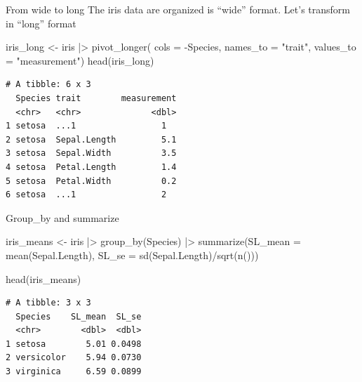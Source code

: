 \documentclass[
  ignorenonframetext,
  aspectratio=169,
]{beamer}
\newenvironment{Shaded}{\begin{snugshade}}{\end{snugshade}}
\newcommand{\AttributeTok}[1]{\textcolor[rgb]{0.40,0.45,0.13}{#1}}
\newcommand{\FunctionTok}[1]{\textcolor[rgb]{0.28,0.35,0.67}{#1}}
\newcommand{\NormalTok}[1]{\textcolor[rgb]{0.00,0.23,0.31}{#1}}
\newcommand{\OtherTok}[1]{\textcolor[rgb]{0.00,0.23,0.31}{#1}}
\newcommand{\SpecialCharTok}[1]{\textcolor[rgb]{0.37,0.37,0.37}{#1}}
\newcommand{\StringTok}[1]{\textcolor[rgb]{0.13,0.47,0.30}{#1}}
\begin{document}
\begin{frame}[fragile]{From wide to long}
\label{from-wide-to-long}
The iris data are organized is ``wide'' format. Let's transform in
``long'' format

\begin{Shaded}
\begin{Highlighting}[]
\NormalTok{iris\_long }\OtherTok{\textless{}{-}}\NormalTok{ iris }\SpecialCharTok{|\textgreater{}} \FunctionTok{pivot\_longer}\NormalTok{( }
                    \AttributeTok{cols =} \SpecialCharTok{{-}}\NormalTok{Species,}
                    \AttributeTok{names\_to =} \StringTok{"trait"}\NormalTok{,}
                    \AttributeTok{values\_to =} \StringTok{"measurement"}\NormalTok{)}
\FunctionTok{head}\NormalTok{(iris\_long)}
\end{Highlighting}
\end{Shaded}

\begin{verbatim}
# A tibble: 6 x 3
  Species trait        measurement
  <chr>   <chr>              <dbl>
1 setosa  ...1                 1  
2 setosa  Sepal.Length         5.1
3 setosa  Sepal.Width          3.5
4 setosa  Petal.Length         1.4
5 setosa  Petal.Width          0.2
6 setosa  ...1                 2  
\end{verbatim}
\end{frame}

\begin{frame}[fragile]{Group\_by and summarize}
\label{group_by-and-summarize}
\begin{Shaded}
\begin{Highlighting}[]
\NormalTok{iris\_means }\OtherTok{\textless{}{-}}\NormalTok{ iris }\SpecialCharTok{|\textgreater{}} 
  \FunctionTok{group\_by}\NormalTok{(Species) }\SpecialCharTok{|\textgreater{}} 
  \FunctionTok{summarize}\NormalTok{(}\AttributeTok{SL\_mean =} \FunctionTok{mean}\NormalTok{(Sepal.Length),}
            \AttributeTok{SL\_se =} \FunctionTok{sd}\NormalTok{(Sepal.Length)}\SpecialCharTok{/}\FunctionTok{sqrt}\NormalTok{(}\FunctionTok{n}\NormalTok{()))}

\FunctionTok{head}\NormalTok{(iris\_means)}
\end{Highlighting}
\end{Shaded}

\begin{verbatim}
# A tibble: 3 x 3
  Species    SL_mean  SL_se
  <chr>        <dbl>  <dbl>
1 setosa        5.01 0.0498
2 versicolor    5.94 0.0730
3 virginica     6.59 0.0899
\end{verbatim}
\end{frame}
\end{document}

